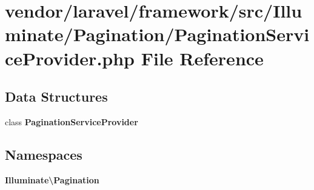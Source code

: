 \section{vendor/laravel/framework/src/\+Illuminate/\+Pagination/\+Pagination\+Service\+Provider.php File Reference}
\label{_pagination_service_provider_8php}
\subsection*{Data Structures}
\begin{DoxyCompactItemize}
\item 
class {\bf Pagination\+Service\+Provider}
\end{DoxyCompactItemize}
\subsection*{Namespaces}
\begin{DoxyCompactItemize}
\item 
 {\bf Illuminate\textbackslash{}\+Pagination}
\end{DoxyCompactItemize}
